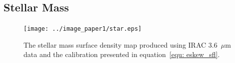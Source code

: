 \subsection{Stellar Mass}
\label{sec:starmass}

\begin{figure}
\centering
\texttt{[image: ../image\_paper1/star.eps]}
\caption[Stellar mass surface density map produced using IRAC 3.6~$\mu$m data]{The stellar mass surface density map produced using IRAC 3.6~$\mu$m data and the calibration presented in equation~\ref{equ: eskew_sfl}.}
\label{fig:stellarmass}
\end{figure}

